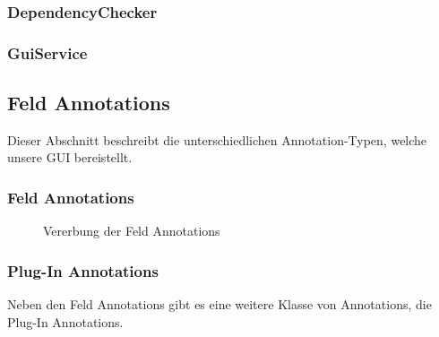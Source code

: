 \documentclass[a4paper, 11pt]{article} %
\begin{document}

\subsubsection{DependencyChecker}
\label{sssub:dependencychecker}


\subsubsection{GuiService}
\label{sssub:guiservice}



\subsection{Feld Annotations} %
\label{sub:annotations}
Dieser Abschnitt beschreibt die unterschiedlichen Annotation-Typen, welche unsere GUI bereistellt.

\subsubsection{Feld Annotations} %
\label{ssub:feld_annotations}

\begin{figure}[!htp]
\caption{Vererbung der Feld Annotations}
\label{fig:field_annotations}
\end{figure}


\subsubsection{Plug-In Annotations} %
\label{ssub:subsection_name}
Neben den Feld Annotations gibt es eine weitere Klasse von Annotations, die Plug-In Annotations. 
\end{document}
